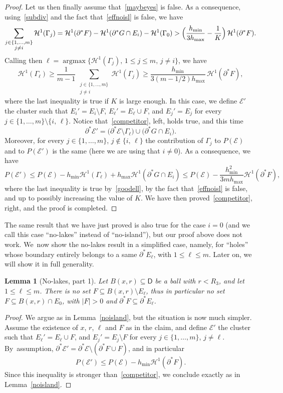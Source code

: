 \documentclass[10pt]{amsart}
\DeclareMathOperator{\argmax}{argmax}
\newcommand\doppio[2]{\substack{#1\\#2}}
\newcommand\E{\mathcal{E}}
\renewcommand\H{\mathcal{H}}
\theoremstyle{plain}
\newtheorem{lem}[thm]{Lemma}
\theoremstyle{definition}
\begin{document}
\begin{proof}
Let us then finally assume that~\eqref{maybeyes} is false. As a consequence, using~\eqref{subdiv} and the fact that~\eqref{effnoisl} is false, we have
\[
\sum_{{\doppio{j\in \{1,\dots,m\}}{j\neq i}}} \H^1(\Gamma_j) = \H^1(\partial^* F) - \H^1(\partial^* G\cap E_i) - \H^1(\Gamma_0)
> \Bigl(\frac{h_{\min}}{3h_{\max}}- \frac 1K\Bigr)\, \H^1(\partial^* F).
\]
Calling then $\ell=\argmax \big\{\H^1(\Gamma_j),\, 1\leq j\leq m,\, j\neq i\big\}$, we have
\begin{equation}\label{goodell}
\H^1(\Gamma_\ell)\geq \frac 1 {m-1}\, \sum_{{\doppio{j\in \{1,\dots,m\}}{j\neq i}}} \H^1(\Gamma_j)
\geq \frac{h_{\min}}{3(m-1/2)h_{\max}}\, \H^1(\partial^* F),
\end{equation}
where the last inequality is true if $K$ is large enough. In this case, we define $\E'$ the cluster such that $E_i'=E_i\setminus F$, $E_\ell'=E_\ell\cup F$, and $E_j'=E_j$ for every $j \in \{1,\dots, m\}\setminus \{i,\, \ell\}$. Notice that~\eqref{competitor}, left, holds true, and this time
\[
\partial^* \E' = \big(\partial^* \E \setminus \Gamma_\ell\big) \cup \big(\partial^* G\cap E_i\big).
\]
Moreover, for every $j\in\{1,\dots,m\}$, $j\notin \{i,\,\ell\}$ the contribution of $\Gamma_j$ to $P(\E)$ and to $P(\E')$ is the same (here we are using that $i\neq 0$). As a consequence, we have
\[
P(\E') \leq P(\E) - h_{\min} \H^1(\Gamma_\ell) + h_{\max} \H^1(\partial^* G\cap E_i) \leq P(\E) - \frac{h_{\min}^2}{3mh_{\max}}\H^1(\partial^* F),
\]
where the last inequality is true by~\eqref{goodell}, by the fact that~\eqref{effnoisl} is false, and up to possibly increasing the value of $K$. We have then proved~\eqref{competitor}, right, and the proof is completed.
\end{proof}

The same result that we have just proved is also true for the case $i=0$ (and we call this case ``no-lakes'' instead of ``no-island''), but our proof above does not work. We~now show the no-lakes result in a simplified case, namely, for ``holes'' whose boundary entirely belongs to a same $\partial^* E_\ell$, with $1\leq \ell\leq m$. Later on, we will show it in full generality.

\begin{lem}[No-lakes, part 1]\label{nolakes}
Let $B(x,r)\subseteq \mathsf{D}$ be a ball with $r< R_3$, and let $1\leq \ell\leq m$. There is no set $F\subseteq B(x,r)\setminus E_\ell$, thus in particular no set $F\subseteq B(x,r)\cap E_0$, with $|F|>0$ and $\partial^* F \subseteq \partial^* E_\ell$.
\end{lem}
\begin{proof}
We argue as in Lemma~\ref{noisland}, but the situation is now much simpler. Assume the existence of $x$, $r$, $\ell$ and $F$ as in the claim, and define $\E'$ the cluster such that $E_\ell'=E_\ell\cup F$, and $E_j'=E_j\setminus F$ for every $j\in\{1,\dots,m\}$, $j\neq \ell$. By~as\-sump\-tion, $\partial^*\E'=\partial^*\E\setminus (\partial^*F\cup F)$, and in particular
\[
P(\E')\leq P(\E) - h_{\min} \H^1(\partial^* F).
\]
Since this inequality is stronger than~\eqref{competitor}, we conclude exactly as in Lemma~\ref{noisland}.
\end{proof}
\end{document}
